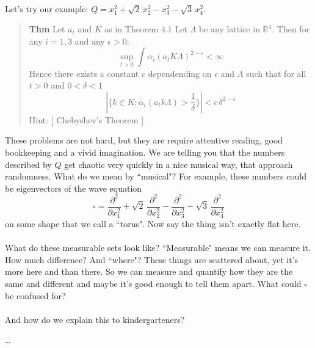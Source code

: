 \documentclass[12pt]{article}
\begin{document}
 \\
Let's try our example:  $Q = x_1^2 + \sqrt{2}\, x_2^2 - x_3^2 - \sqrt{3}\, x_4^2$. 
\begin{quotation} \noindent 
\textbf{Thm} Let $a_t$ and $K$ as in Theorem 4.1 Let $\Lambda$ be any lattice in $\mathbb{R}^4$.  Then for any $i = 1,3$ and any $\epsilon > 0$:
$$ \sup_{t > 0} \int \alpha_i(a_t K \Lambda )^{2-\epsilon} < \infty  $$
Hence there exists a constant $c$ dependending on $ \epsilon$ and $\Lambda$ such that for all $t > 0$ and $0 < \delta < 1$ 
$$ | \{ k \in K : \alpha_i(a_t k \Lambda) > \frac{1}{\delta} \}| < c \, \delta^{2-\epsilon} $$
Hint: [ Chebyshev's Theorem ]
\end{quotation}
These problems are not hard, but they are require attentive reading, good bookkeeping and a vivid imagination.  We are telling you that the numbers described by $Q$ get chaotic very quickly in a nice musical way, that approach randomness.  What do we mean by ``musical"?  For example, these numbers could be eigenvectors of the wave equation $$\square =  \frac{\partial^2}{\partial x_1^2} + \sqrt{2} \, \frac{\partial^2}{\partial x_2^2} - \frac{\partial^2}{\partial x_3^2}  - \sqrt{3} \, \frac{\partial^2}{\partial x_4^2}$$ on some shape that we call a ``torus".  Now say the thing isn't exactly flat here.  \\ \\
What do these measurable sets look like?  ``Measurable" means we can measure it.  How much difference?  And ``where"?  These things are scattered about, yet it's more here and than there.  So we can measure and quantify how they are the same and different and maybe it's good enough to tell them apart.  What could $\square$ be confused for? \\ \\
And how do we explain this to kindergarteners? 





\vfill



\begin{thebibliography}{}

\item \dots 

\end{thebibliography}
\end{document}

